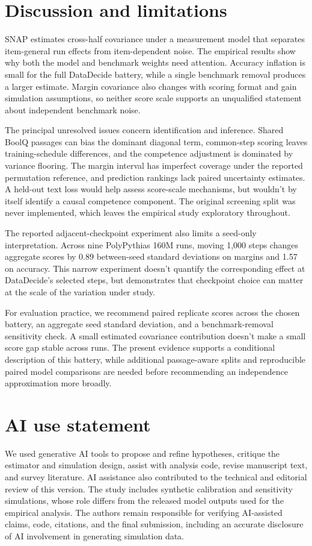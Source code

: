 \documentclass{article}
\begin{document}
\section{Discussion and limitations}
SNAP estimates cross-half covariance under a measurement model that separates item-general run effects from item-dependent noise. The empirical results show why both the model and benchmark weights need attention. Accuracy inflation is small for the full DataDecide battery, while a single benchmark removal produces a larger estimate. Margin covariance also changes with scoring format and gain simulation assumptions, so neither score scale supports an unqualified statement about independent benchmark noise.

The principal unresolved issues concern identification and inference. Shared BoolQ passages can bias the dominant diagonal term, common-step scoring leaves training-schedule differences, and the competence adjustment is dominated by variance flooring. The margin interval has imperfect coverage under the reported permutation reference, and prediction rankings lack paired uncertainty estimates. A held-out text loss would help assess score-scale mechanisms, but wouldn't by itself identify a causal competence component. The original screening split was never implemented, which leaves the empirical study exploratory throughout.

The reported adjacent-checkpoint experiment also limits a seed-only interpretation. Across nine PolyPythias 160M runs, moving 1,000 steps changes aggregate scores by 0.89 between-seed standard deviations on margins and 1.57 on accuracy. This narrow experiment doesn't quantify the corresponding effect at DataDecide's selected steps, but demonstrates that checkpoint choice can matter at the scale of the variation under study.

For evaluation practice, we recommend paired replicate scores across the chosen battery, an aggregate seed standard deviation, and a benchmark-removal sensitivity check. A small estimated covariance contribution doesn't make a small score gap stable across runs. The present evidence supports a conditional description of this battery, while additional passage-aware splits and reproducible paired model comparisons are needed before recommending an independence approximation more broadly.

\clearpage
\section*{AI use statement}
We used generative AI tools to propose and refine hypotheses, critique the estimator and simulation design, assist with analysis code, revise manuscript text, and survey literature. AI assistance also contributed to the technical and editorial review of this version. The study includes synthetic calibration and sensitivity simulations, whose role differs from the released model outputs used for the empirical analysis. The authors remain responsible for verifying AI-assisted claims, code, citations, and the final submission, including an accurate disclosure of AI involvement in generating simulation data.
\end{document}
